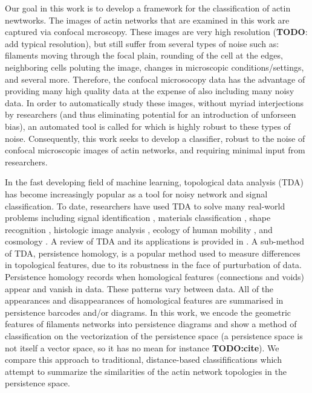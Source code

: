 \documentclass[10pt]{article}
\begin{document}
Our goal in this work is to develop a framework for the classification of actin newtworks. The images of actin networks that are examined in this work are captured via confocal mcroscopy. These images are very high resolution (\textbf{TODO}: add typical resolution), but still suffer from several types of noise such as: filaments moving through the focal plain, rounding of the cell at the edges, neighboring cells poluting the image, changes in microscopic conditions/settings, and several more. Therefore, the confocal microsocopy data has the advantage of providing many high quality data at the expense of also including many noisy data. In order to automatically study these images, without myriad interjections by researchers (and thus eliminating potential for an introduction of unforseen bias), an automated tool is called for which is highly robust to these types of noise. Consequently, this work seeks to develop a classifier, robust to the noise of confocal microscopic images of actin networks, and requiring minimal input from researchers.

In the fast developing field of machine learning, topological data analysis (TDA) has become increasingly popular as a tool for noisy network and signal classification. To date, researchers have used TDA to solve many real-world problems including signal identification \cite{marchese2016topological}, materials classification \cite{hiraoka2016hierarchical,maroulas2019bayesian}, shape recognition \cite{bonis2016persistence,li2014persistence}, histologic image analysis \cite{belchi2018lung,nicolau2011topology,singh2014topological}, ecology of human mobility \cite{chen2017measuring,chen2019generalized}, and cosmology \cite{sousbie2011persistent,van2010alpha}. A review of TDA and its applications is provided in \cite{wasserman2018topological}. A sub-method of TDA, persistence homology, is a popular method used to measure differences in topological features, due to its robustness in the face of purturbation of data. Persistence homology records when homological features (connections and voids) appear and vanish in data. These patterns vary between data. All of the appearances and disappearances of homological features are summarised in persistence barcodes and/or diagrams. In this work, we encode the geometric features of filaments networks into persistence diagrams and show a method of classification on the vectorization of the persistence space (a persistence space is not itself a vector space, so it has no mean for instance \textbf{TODO:cite}). We compare this approach to traditional, distance-based classififications which attempt to summarize the similarities of the actin network topologies in the persistence space.
\end{document}
